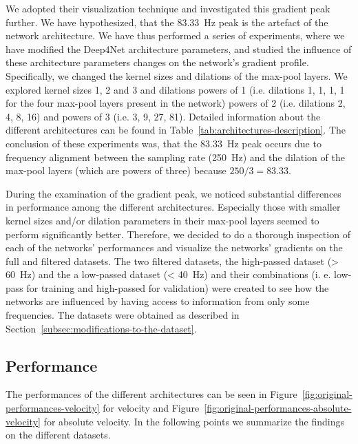We adopted their visualization technique and investigated this gradient peak further. We have hypothesized, that the 83.33~Hz peak is the artefact of the network architecture. We have thus 
performed a series of experiments, where we have modified the Deep4Net architecture parameters, and 
studied the influence of these architecture parameters changes on the network's gradient profile.
Specifically, we changed the kernel sizes and dilations of the max-pool layers. We explored kernel sizes 1, 2 and 3 and dilations powers of 1 (i.e. dilations 1, 1, 1, 1  for the four max-pool layers present in the network) powers of 2 (i.e. dilations 2, 4, 8, 16) and powers of 3 (i.e. 3, 9, 27, 81). Detailed information about the different architectures can be found in Table~\ref{tab:architectures-description}.
The conclusion of these experiments was, that the 83.33~Hz peak occurs due to frequency alignment between the sampling rate (250~Hz) and the dilation of the max-pool layers (which are powers of three) because $ 250/3 = 83.33$.

During the examination of the gradient peak, we noticed substantial differences in performance among the different architectures.
Especially those with smaller kernel sizes and/or dilation parameters in their max-pool layers seemed to perform significantly better.
Therefore, we decided to do a thorough inspection of each of the networks' performances and visualize the networks' gradients on the full and filtered datasets. 
The two filtered datasets, the high-passed dataset (> 60~Hz) and the a low-passed dataset (< 40~Hz) and their combinations (i. e. low-pass for training and high-passed for validation) were created to see how the networks are influenced by having access to information from only some frequencies. The datasets were obtained as described in Section~\ref{subsec:modifications-to-the-dataset}.

\subsection{Performance}\label{subsec:performance}
The performances of the different architectures can be seen in Figure~\ref{fig:original-performances-velocity} for velocity and Figure~\ref{fig:original-performances-absolute-velocity} for absolute velocity.
In the following points we summarize the findings on the different datasets.

